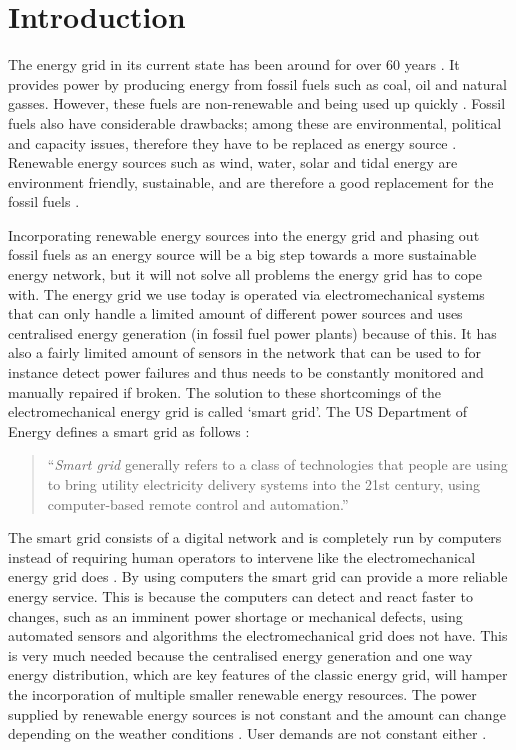\section{Introduction}\label{intro}
The energy grid in its current state has been around for over 60 years . It provides power by producing energy from fossil fuels such as coal, oil and natural gasses. However, these fuels are non-renewable and being used up quickly . Fossil fuels also have considerable drawbacks; among these are environmental, political and capacity issues, therefore they have to be replaced as energy source \cite{friedman2008hot}. Renewable energy sources such as wind, water, solar and tidal energy are environment friendly, sustainable, and are therefore a good replacement for the fossil fuels \cite{Tromly2001}.

Incorporating renewable energy sources into the energy grid and phasing out fossil fuels as an energy source will be a big step towards a more sustainable energy network, but it will not solve all problems the energy grid has to cope with. The energy grid we use today is operated via electromechanical systems that can only handle a limited amount of different power sources and uses centralised energy generation  (in fossil fuel power plants) because of this. It has also a fairly limited amount of sensors in the network that can be used to for instance detect power failures and thus needs to be constantly monitored and manually repaired  if broken. The solution to these shortcomings of the electromechanical energy grid is called `smart grid'. The US Department of Energy defines a smart grid as follows \cite{doe}: 
 
\begin{quote}
``\emph{Smart grid} generally refers to a class of technologies that people are using to bring utility electricity delivery systems into the 21st century, using computer-based remote control and automation.''
\end{quote}

The smart grid consists of a digital network and is completely run by computers instead of requiring human operators to intervene like the electromechanical energy grid does \cite{Moslehi2010}.  By using computers the smart grid can provide a more reliable energy service. This is because the computers can detect and react faster to changes, such as an imminent power shortage or mechanical defects, using automated sensors and algorithms the electromechanical grid does not have.  This is very much needed because the centralised energy generation and one way energy distribution, which are key features of the classic energy grid, will hamper the incorporation of multiple smaller renewable energy resources. The power supplied by renewable energy sources is not constant and the amount can change depending on the weather conditions \cite{RamchurnVitelingumRogersJennings2014}. User demands are not constant either .

